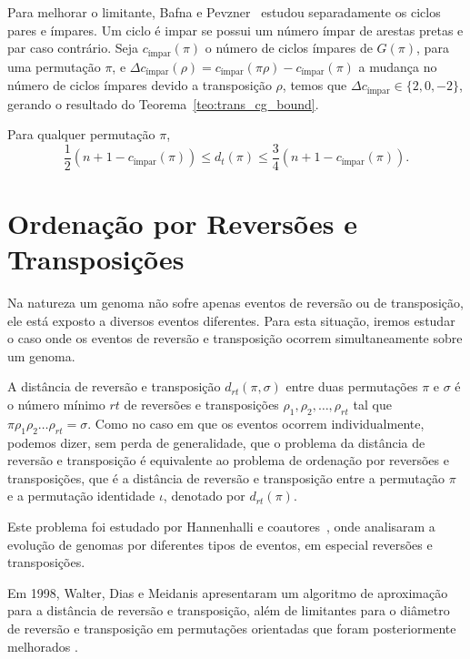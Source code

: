 Para melhorar o limitante, Bafna e Pevzner~\cite{BafnaPevzner*1998}
estudou separadamente os ciclos pares e ímpares. Um ciclo é impar se
possui um número ímpar de arestas pretas e par caso contrário. Seja
$c_{\text{ímpar}}(\pi)$ o número de ciclos ímpares de $G(\pi)$, para
uma permutação $\pi$, e $\Delta c_{\text{ímpar}} (\rho) =
c_{\text{ímpar}} (\pi \rho) - c_{\text{ímpar}} (\pi)$ a mudança no
número de ciclos ímpares devido a transposição $\rho$, temos que
$\Delta c_{\text{ímpar}} \in \{2, 0, -2\}$, gerando o resultado do
Teorema~\ref{teo:trans_cg_bound}.

\begin{teo} 
  \label{teo:trans_cg_bound} 
  Para qualquer permutação $\pi$, 
  \[ 
  \frac{1}{2}(n + 1 - c_{\text{ímpar}}(\pi)) \leq d_t(\pi) \leq \frac{3}{4} (n
  + 1 - c_{\text{ímpar}}(\pi)).
  \]
\end{teo}

\section{Ordenação por Reversões e Transposições}
\label{sec:rev_trans}
Na natureza um genoma não sofre apenas eventos de reversão ou de
transposição, ele está exposto a diversos eventos diferentes. Para
esta situação, iremos estudar o caso onde os eventos de reversão e
transposição ocorrem simultaneamente sobre um genoma.

A distância de reversão e transposição $d_{rt}(\pi, \sigma)$ entre
duas permutações $\pi$ e $\sigma$ é o número mínimo $rt$ de reversões
e transposições $\rho_{1}, \rho_{2}, \ldots, \rho_{rt}$ tal que
$\pi \rho_{1} \rho_{2} \ldots \rho_{rt} = \sigma$. Como no caso em que
os eventos ocorrem individualmente, podemos dizer, sem perda de
generalidade, que o problema da distância de reversão e transposição é
equivalente ao problema de ordenação por reversões e transposições,
que é a distância de reversão e transposição entre a permutação $\pi$ e a
permutação identidade $\iota$, denotado por $d_{rt}(\pi)$.

Este problema foi estudado por Hannenhalli e
coautores~\cite{HannenhalliChappeyKooninPevzner*1995}, onde
analisaram a evolução de genomas por diferentes tipos de eventos, em
especial reversões e transposições. 

Em 1998, Walter, Dias e Meidanis \cite{WalterDiasMeidanis*1998}
apresentaram um algoritmo de aproximação para a distância de reversão
e transposição, além de limitantes para o diâmetro de reversão e
transposição em permutações orientadas que foram posteriormente
melhorados \cite{MeidanisWalterDias*2002}.

